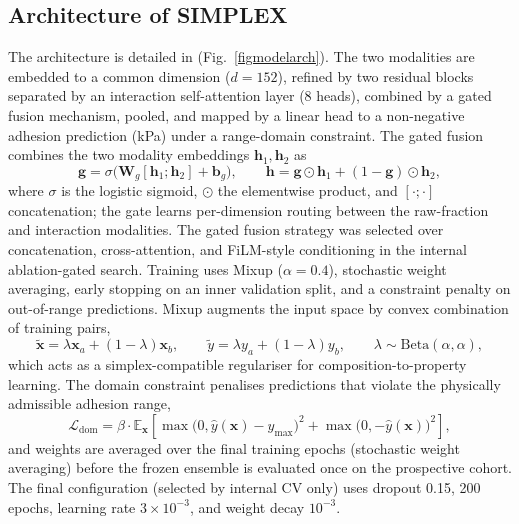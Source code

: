 \documentclass[utf8]{FrontiersinHarvard}
\newcommand{\Fref}[2]{Fig.~\hyperref[#1]{\ref{#1}#2}}
\begin{document}
\subsection{Architecture of SIMPLEX}

The architecture is detailed in (\Fref{figmodelarch}{}). The two modalities are embedded to a common dimension ($d=152$), refined by two residual blocks separated by an interaction self-attention layer (8 heads), combined by a gated fusion mechanism, pooled, and mapped by a linear head to a non-negative adhesion prediction (kPa) under a range-domain constraint. The gated fusion combines the two modality embeddings $\mathbf{h}_1, \mathbf{h}_2$ as
\begin{equation}
\mathbf{g} = \sigma\bigl(\mathbf{W}_g [\mathbf{h}_1; \mathbf{h}_2] + \mathbf{b}_g\bigr), \qquad
\mathbf{h} = \mathbf{g} \odot \mathbf{h}_1 + (1 - \mathbf{g}) \odot \mathbf{h}_2,
\label{eq:gated}
\end{equation}
where $\sigma$ is the logistic sigmoid, $\odot$ the elementwise product, and $[\cdot;\cdot]$ concatenation; the gate learns per-dimension routing between the raw-fraction and interaction modalities. The gated fusion strategy was selected over concatenation, cross-attention, and FiLM-style conditioning in the internal ablation-gated search. Training uses Mixup ($\alpha=0.4$), stochastic weight averaging, early stopping on an inner validation split, and a constraint penalty on out-of-range predictions. Mixup augments the input space by convex combination of training pairs,
\begin{equation}
\tilde{\mathbf{x}} = \lambda \mathbf{x}_a + (1 - \lambda) \mathbf{x}_b, \qquad \tilde{y} = \lambda y_a + (1 - \lambda) y_b, \qquad \lambda \sim \mathrm{Beta}(\alpha, \alpha),
\label{eq:mixup}
\end{equation}
which acts as a simplex-compatible regulariser for composition-to-property learning. The domain constraint penalises predictions that violate the physically admissible adhesion range,
\begin{equation}
\mathcal{L}_{\mathrm{dom}} = \beta \cdot \mathbb{E}_{\mathbf{x}}\left[ \max\bigl(0, \hat{y}(\mathbf{x}) - y_{\max}\bigr)^2 + \max\bigl(0, -\hat{y}(\mathbf{x})\bigr)^2 \right],
\label{eq:dom}
\end{equation}
and weights are averaged over the final training epochs (stochastic weight averaging) before the frozen ensemble is evaluated once on the prospective cohort. The final configuration (selected by internal CV only) uses dropout 0.15, 200 epochs, learning rate $3\times10^{-3}$, and weight decay $10^{-3}$.
\end{document}
